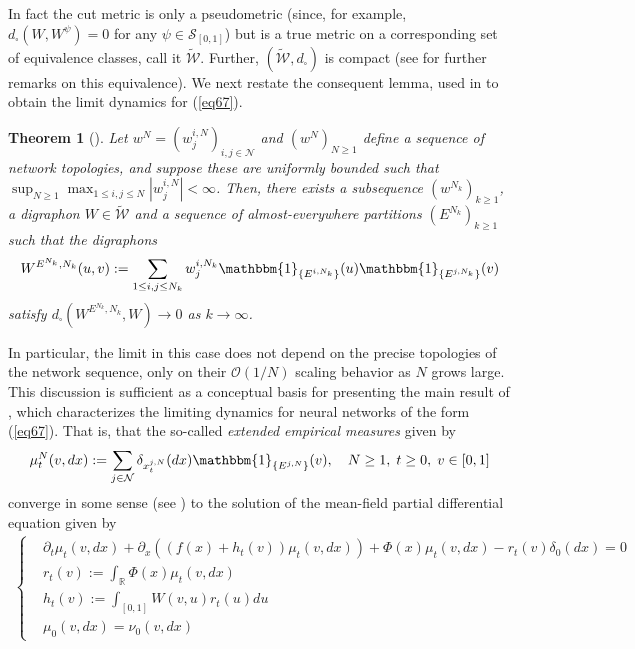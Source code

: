 \documentclass[12pt, oneside]{report}
\newcommand{\mbb}[1]{\mathbb{#1}}
\newcommand{\1}[1]{\mathbbm{1}_{\{#1\}}}
\newcommand{\mc}[1]{\mathcal{#1}}
\newtheorem{theorem}{Theorem}[section]
\theoremstyle{definition}
\begin{document}
In fact the cut metric is only a pseudometric (since, for example,
$d_\square(W,W^\psi)=0$ for any $\psi\in\mc{S}_{[0,1]}$) but is a true metric on
a corresponding set of equivalence classes, call it $\widetilde{\mc{W}}$.
Further, $(\widetilde{\mc{W}},d_\square)$ is compact \cite[\S5, theorem
5.1]{Lovász_Szegedy_2007} (see \cite[\S8.2]{Lovasz_2012} for further remarks on
this equivalence). We next restate the consequent lemma, used in \cite[\S2.1,
lemma 1]{Jabin_Schmutz_Zhou_2024} to obtain the limit dynamics for (\ref{eq67}).
\begin{theorem}[{\cite[\S2.1, lemma 2]{Jabin_Schmutz_Zhou_2024}}]\label{thm5}
    Let $w^N=(w^{i,N}_j)_{i,j\in\mc{N}}$ and $(w^N)_{N\geq 1}$ define a sequence
    of network topologies, and suppose these are uniformly bounded such that
    $\sup_{N\geq 1}\max_{1\leq i,j\leq N}|w^{i,N}_j|<\infty$. Then, there exists
    a subsequence $(w^{N_k})_{k\geq 1}$, a digraphon $W\in\widetilde{\mc{W}}$
    and a sequence of almost-everywhere partitions $(E^{N_k})_{k\geq 1}$ such
    that the digraphons
    \begin{align*}
        W^{E^{N_k},N_k}(u,v):=\sum_{1\leq i,j\leq N_k}w^{i,N_k}_j\1{E^{i,N_k}}(u)\1{E^{j,N_k}}(v)
    \end{align*}
    satisfy $d_\square(W^{E^{N_k},N_k},W)\rightarrow 0$ as $k\rightarrow\infty$.
\end{theorem}
In particular, the limit in this case does not depend on the precise topologies
of the network sequence, only on their $\mc{O}(1/N)$ scaling behavior as $N$
grows large. This discussion is sufficient as a conceptual basis for presenting
the main result of \cite{Jabin_Schmutz_Zhou_2024}, which characterizes the
limiting dynamics for neural networks of the form (\ref{eq67}). That is, that
the so-called \textit{extended empirical measures} given by
\begin{align}
    \mu^N_t(v,dx):=\sum_{j\in\mc{N}}\delta_{x^{j,N}_t}(dx)\1{E^{j,N}}(v),\quad N\geq 1,\;t\geq 0,\;v\in[0,1]\label{eq71}
\end{align}
converge in some sense (see \cite[\S2.2]{Jabin_Schmutz_Zhou_2024}) to the
solution of the mean-field partial differential equation given by
\begin{align}
    \begin{cases}
        &\partial_t\mu_t(v,dx)+\partial_x\left((f(x)+h_t(v))\mu_t(v,dx)\right)+\Phi(x)\mu_t(v,dx)-r_t(v)\delta_0(dx)=0\\
        &r_t(v):=\int_\mbb{R}\Phi(x)\mu_t(v,dx)\\
        &h_t(v):=\int_{[0,1]}W(v,u)r_t(u)du\\
        &\mu_0(v,dx)=\nu_0(v,dx)
    \end{cases}\label{eq92}
\end{align}
\end{document}
